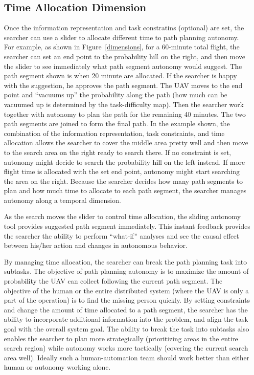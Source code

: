\documentclass[journal]{IEEEtran}
\begin{document}
\subsection{Time Allocation Dimension}

Once the information representation and task constratins (optional) are set, the searcher can use a slider to allocate different time to path planning autonomy. For example, as shown in Figure~\ref{dimensions}, for a 60-minute total flight, the searcher can set an end point to the probability hill on the right, and then move the slider to see immediately what path segment autonomy would suggest. The path segment shown is when 20 minute are allocated. If the searcher is happy with the suggestion, he approves the path segment. The UAV moves to the end point and ``vacuums up'' the probability along the path (how much can be vacuumed up is determined by the task-difficulty map). Then the searcher work together with autonomy to plan the path for the remaining 40 minutes. The two path segments are joined to form the final path. In the example shown, the combination of the information representation, task constraints, and time allocation allows the searcher to cover the middle area pretty well and then move to the search area on the right ready to search there. If no constraint is set, autonomy might decide to search the probability hill on the left instead. If more flight time is allocated with the set end point, autonomy might start searching the area on the right. Because the searcher decides how many path segments to plan and how much time to allocate to each path segment, the searcher manages autonomy along a temporal dimension.

As the search moves the slider to control time allocation, the sliding autonomy tool provides suggested path segment immediately. This instant feedback provides the searcher the ability to perform ``what-if'' analyses and see the causal effect between his/her action and changes in autonomous behavior. 

By managing time allocation, the searcher can break the path planning task into subtasks. The objective of path planning autonomy is to maximize the amount of probability the UAV can collect following the current path segment. The objective of the human or the entire distributed system (where the UAV is only a part of the operation) is to find the missing person quickly. By setting constraints and change the amount of time allocated to a path segment, the searcher has the ability to incorporate additional information into the problem, and align the task goal with the overall system goal. The ability to break the task into subtasks also enables the searcher to plan more strategically (prioritizing areas in the entire search region) while autonomy works more tactically (covering the current search area well). Ideally such a human-automation team should work better than either human or autonomy working alone.
\end{document}
